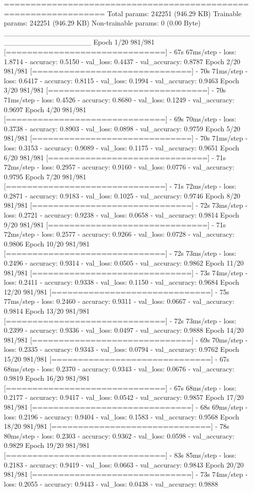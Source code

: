 \documentclass[11pt, a4paper]{article} %
\begin{document}
=================================================================
Total params: 242251 (946.29 KB)
Trainable params: 242251 (946.29 KB)
Non-trainable params: 0 (0.00 Byte)
_________________________________________________________________
Epoch 1/20
981/981 [==============================] - 67s 67ms/step - loss: 1.8714 - accuracy: 0.5150 - val_loss: 0.4437 - val_accuracy: 0.8787
Epoch 2/20
981/981 [==============================] - 70s 71ms/step - loss: 0.6417 - accuracy: 0.8115 - val_loss: 0.1994 - val_accuracy: 0.9463
Epoch 3/20
981/981 [==============================] - 70s 71ms/step - loss: 0.4526 - accuracy: 0.8680 - val_loss: 0.1249 - val_accuracy: 0.9697
Epoch 4/20
981/981 [==============================] - 69s 70ms/step - loss: 0.3738 - accuracy: 0.8903 - val_loss: 0.0898 - val_accuracy: 0.9759
Epoch 5/20
981/981 [==============================] - 70s 71ms/step - loss: 0.3153 - accuracy: 0.9089 - val_loss: 0.1175 - val_accuracy: 0.9651
Epoch 6/20
981/981 [==============================] - 71s 72ms/step - loss: 0.2957 - accuracy: 0.9160 - val_loss: 0.0776 - val_accuracy: 0.9795
Epoch 7/20
981/981 [==============================] - 71s 72ms/step - loss: 0.2871 - accuracy: 0.9183 - val_loss: 0.1025 - val_accuracy: 0.9746
Epoch 8/20
981/981 [==============================] - 72s 73ms/step - loss: 0.2721 - accuracy: 0.9238 - val_loss: 0.0658 - val_accuracy: 0.9814
Epoch 9/20
981/981 [==============================] - 71s 72ms/step - loss: 0.2577 - accuracy: 0.9266 - val_loss: 0.0728 - val_accuracy: 0.9806
Epoch 10/20
981/981 [==============================] - 72s 73ms/step - loss: 0.2496 - accuracy: 0.9314 - val_loss: 0.0505 - val_accuracy: 0.9862
Epoch 11/20
981/981 [==============================] - 73s 74ms/step - loss: 0.2411 - accuracy: 0.9338 - val_loss: 0.1150 - val_accuracy: 0.9684
Epoch 12/20
981/981 [==============================] - 75s 77ms/step - loss: 0.2460 - accuracy: 0.9311 - val_loss: 0.0667 - val_accuracy: 0.9814
Epoch 13/20
981/981 [==============================] - 72s 73ms/step - loss: 0.2399 - accuracy: 0.9336 - val_loss: 0.0497 - val_accuracy: 0.9888
Epoch 14/20
981/981 [==============================] - 69s 70ms/step - loss: 0.2335 - accuracy: 0.9343 - val_loss: 0.0794 - val_accuracy: 0.9762
Epoch 15/20
981/981 [==============================] - 67s 68ms/step - loss: 0.2370 - accuracy: 0.9343 - val_loss: 0.0676 - val_accuracy: 0.9819
Epoch 16/20
981/981 [==============================] - 67s 68ms/step - loss: 0.2177 - accuracy: 0.9417 - val_loss: 0.0542 - val_accuracy: 0.9857
Epoch 17/20
981/981 [==============================] - 68s 69ms/step - loss: 0.2196 - accuracy: 0.9404 - val_loss: 0.1583 - val_accuracy: 0.9568
Epoch 18/20
981/981 [==============================] - 78s 80ms/step - loss: 0.2303 - accuracy: 0.9362 - val_loss: 0.0598 - val_accuracy: 0.9829
Epoch 19/20
981/981 [==============================] - 83s 85ms/step - loss: 0.2183 - accuracy: 0.9419 - val_loss: 0.0663 - val_accuracy: 0.9843
Epoch 20/20
981/981 [==============================] - 73s 74ms/step - loss: 0.2055 - accuracy: 0.9443 - val_loss: 0.0438 - val_accuracy: 0.9888
\end{document}
